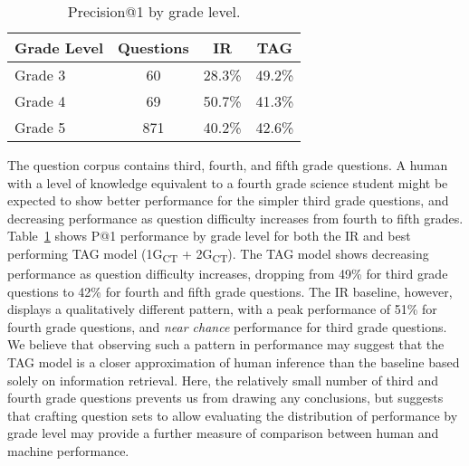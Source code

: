 %
%
\begin{table}[t]
\small
\begin{center}
\begin{tabular}{lccc}
\hline
\multicolumn{1}{c}{Grade Level} & \multicolumn{1}{c}{Questions} &\multicolumn{1}{c}{IR} & \multicolumn{1}{c}{TAG}  \\
\cline{2-3}
\hline
Grade 3 	& 60		&	28.3\%		& 49.2\%	\\
Grade 4		& 69 	&	50.7\%		& 41.3\%	\\
Grade 5		& 871	&	40.2\%		& 42.6\%	\\

\end{tabular}
\caption{{ Precision@1 by grade level. }} %
\label{tab:gradelevel}
\end{center}
\end{table}


{} The question corpus contains third, fourth, and fifth grade questions.  A human with a level of knowledge equivalent to a fourth grade science student might be expected to show better performance for the simpler third grade questions, and decreasing performance as question difficulty increases from fourth to fifth grades.  Table~\ref{tab:gradelevel} shows P@1 performance by grade level for both the IR and best performing TAG model (1G\textsubscript{CT} + 2G\textsubscript{CT}).  The TAG model shows decreasing performance as question difficulty increases, dropping from 49\% for third grade questions to 42\% for fourth and fifth grade questions.  The IR baseline, however, displays a qualitatively different pattern, with a peak performance of 51\% for fourth grade questions, and {\em near chance} performance for third grade questions. 
We believe that observing such a pattern in performance may suggest that the TAG model is a closer approximation of human inference than the baseline based solely on information retrieval.  Here, the relatively small number of third and fourth grade questions prevents us from drawing any conclusions, but suggests that crafting question sets to allow evaluating the distribution of performance by grade level may provide a further measure of comparison between human and machine performance. 



